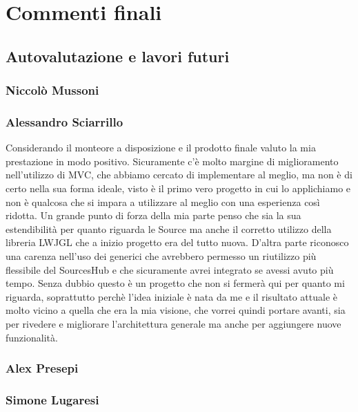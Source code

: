 \documentclass[a4paper,12pt]{report}
\begin{document}
\chapter{Commenti finali}
\section{Autovalutazione e lavori futuri}
\subsection*{Niccolò Mussoni}
\subsection*{Alessandro Sciarrillo}
Considerando il monteore a disposizione e il prodotto finale valuto la mia prestazione in modo positivo.
Sicuramente c'è molto margine di miglioramento nell'utilizzo di MVC, che abbiamo cercato di implementare al meglio, ma non è di certo nella sua forma ideale, visto è il primo vero progetto in cui lo applichiamo e non è qualcosa che si impara a utilizzare al meglio con una esperienza così ridotta. Un grande punto di forza della mia parte penso che sia la sua estendibilità per quanto riguarda le Source ma anche il corretto utilizzo della libreria LWJGL che a inizio progetto era del tutto nuova. D'altra parte riconosco una carenza nell'uso dei generici che avrebbero permesso un riutilizzo più flessibile del SourcesHub e che sicuramente avrei integrato se avessi avuto più tempo.
Senza dubbio questo è un progetto che non si fermerà qui per quanto mi riguarda, soprattutto perchè l'idea iniziale è nata da me e il risultato attuale è molto vicino a quella che era la mia visione, che vorrei quindi portare avanti, sia per rivedere e migliorare l'architettura generale ma anche per aggiungere nuove funzionalità.
\subsection*{Alex Presepi}
\subsection*{Simone Lugaresi}

\appendix
\end{document}
